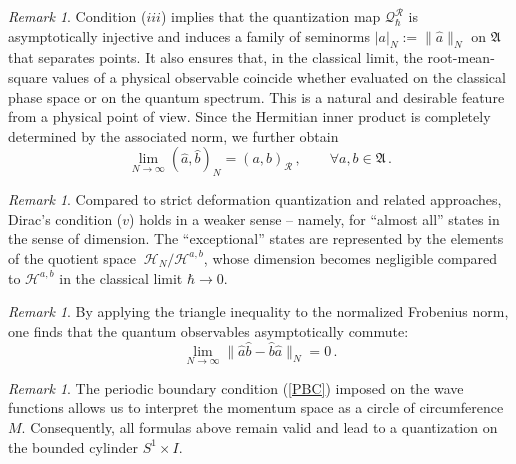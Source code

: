 \documentclass[12pt,a4paper]{article}
\numberwithin{equation}{section}
\theoremstyle{theorem}
\theoremstyle{remark}
\newtheorem{remark}[equation]{Remark}
\newcommand{\R}{\mathcal{R}}
\newcommand{\hh}{\mathcal{H}}
\newcommand{\fa}{\mathfrak{A}}
\newcommand{\qq}{\mathcal{Q}_{\hbar}}
\begin{document}
\begin{remark}
Condition ($iii$) implies that the quantization map $\qq^\R$ is asymptotically injective and induces a family of seminorms $|a|_N:=\|\hat{a}\|_N$ on $\fa$ that separates points. It also ensures that, in the classical limit, the root-mean-square values of a physical observable coincide whether evaluated on the classical phase space or on the quantum spectrum. This is a natural and desirable feature from a physical point of view. Since the Hermitian inner product is completely determined by the associated norm, we further obtain
         \begin{equation}
             \lim_{N\to\infty}(\hat a, \hat b)_N=(a,b)_\R\,,\qquad \forall a,b\in \fa\,.
         \end{equation} 
        \end{remark}
\begin{remark}
Compared to strict deformation quantization and related approaches, Dirac's condition ($v$) holds in a weaker sense -- namely, for ``almost all'' states in the sense of dimension.   The ``exceptional'' states are represented by the elements of the quotient space $~{\hh_N/\hh^{a,b}}$, whose dimension becomes negligible compared to $\hh^{a,b}$ in the classical limit $\hbar\rightarrow 0$.          
\end{remark}
\begin{remark}
    By applying the triangle inequality to the normalized Frobenius norm, one finds that the quantum observables asymptotically commute: 
    \begin{equation}\label{zzN}
      \lim_{N\to \infty}\|\hat a\hat b-\hat b\hat a\|_N=0\,.
  \end{equation}
  \end{remark}
        
\begin{remark}
    The periodic boundary condition (\ref{PBC}) imposed on the wave functions allows us to interpret the momentum space as a circle of circumference $M$. Consequently, all formulas above remain valid and lead to a quantization on the bounded cylinder  $S^1\times I$. 
\end{remark}
       
\end{document}
